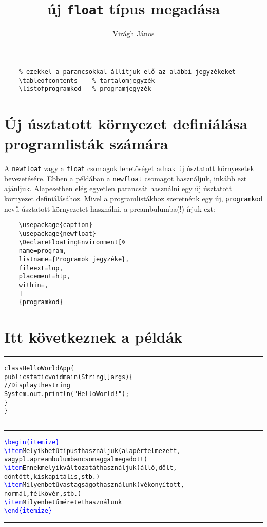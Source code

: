 \documentclass{article}
\title{új \texttt{float} típus megadása}
\author{Virágh János}
\begin{document}
\maketitle	
\begin{verbatim}
	% ezekkel a parancsokkal állítjuk elő az alábbi jegyzékeket
	\tableofcontents    % tartalomjegyzék
	\listofprogramkod   % programjegyzék
\end{verbatim}
\tableofcontents
\listofprogramkod
%
\section{Új úsztatott környezet definiálása programlisták számára}
%
A \verb!newfloat! vagy a \verb!float!  csomagok lehetőséget adnak új úsztatott környezetek bevezetésére. Ebben a példában a  \verb!newfloat! csomagot használjuk, inkább ezt ajánljuk. Alapesetben elég egyetlen parancsát használni egy új úsztatott környezet definiálásához. Mivel a programlistákhoz szeretnénk egy új, \verb!programkod! nevű úsztatott környezetet használni, a preambulumba(!) írjuk ezt:
\begin{verbatim}
	\usepackage{caption}
	\usepackage{newfloat}
	\DeclareFloatingEnvironment[%
	name=program,
	listname={Programok jegyzéke},
	fileext=lop,
	placement=htp,
	within=,
	]
	{programkod}
\end{verbatim}
%
\section{Itt következnek a példák}
%
 \hulipsum[1]

\begin{programkod}
\rule{\linewidth}{1pt}	
\begin{alltt} % Java kód
    class HelloWorldApp \{
        public static void main(String[] args) \{
            //Display the string
            System.out.println("Hello World!");
        \}
    \}
\end{alltt}
\rule{\linewidth}{1pt}
\caption{A Hello World! program  Java nyelvű változata}
\end{programkod}

\hulipsum[1-2]

\begin{programkod}
\rule{\linewidth}{1pt}
\begin{alltt} % kiszínezett LaTeX kód
    \textcolor{blue}{\textbackslash{}begin\{itemize\}}
        \textcolor{blue}{\textbackslash{}item} Melyik betűtípust használjuk (alapértelmezett,
        vagy pl. a preambulumban csomaggal megadott)
        \textcolor{blue}{\textbackslash{}item} Ennek melyik változatát használjuk (álló, dőlt,
        döntött, kiskapitális,stb.)
        \textcolor{blue}{\textbackslash{}item} Milyen betűvastagságot használunk (vékonyított,
        normál, félkövér, stb.)
        \textcolor{blue}{\textbackslash{}item} Milyen betűméretet használunk
    \textcolor{blue}{\textbackslash{}end\{itemize\}}
\end{alltt}
\rule{\linewidth}{1pt}
\caption{A betűtípusok választása a \LaTeX{}-ben}
\end{programkod}
\hulipsum[1]
\end{document}
